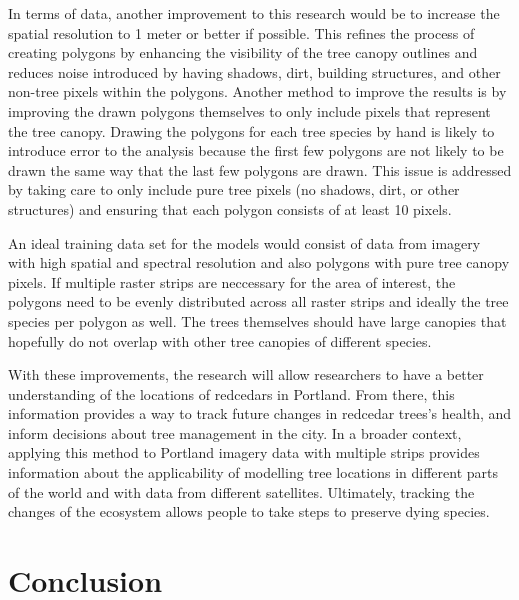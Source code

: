 \documentclass[12pt,twoside]{reedthesis}
\begin{document}
In terms of data, another improvement to this research would be to increase the spatial resolution to 1 meter or better if possible. This refines the process of creating polygons by enhancing the visibility of the tree canopy outlines and reduces noise introduced by having shadows, dirt, building structures, and other non-tree pixels within the polygons. Another method to improve the results is by improving the drawn polygons themselves to only include pixels that represent the tree canopy. Drawing the polygons for each tree species by hand is likely to introduce error to the analysis because the first few polygons are not likely to be drawn the same way that the last few polygons are drawn. This issue is addressed by taking care to only include pure tree pixels (no shadows, dirt, or other structures) and ensuring that each polygon consists of at least 10 pixels.

An ideal training data set for the models would consist of data from imagery with high spatial and spectral resolution and also polygons with pure tree canopy pixels. If multiple raster strips are neccessary for the area of interest, the polygons need to be evenly distributed across all raster strips and ideally the tree species per polygon as well. The trees themselves should have large canopies that hopefully do not overlap with other tree canopies of different species.

With these improvements, the research will allow researchers to have a better understanding of the locations of redcedars in Portland. From there, this information provides a way to track future changes in redcedar trees's health, and inform decisions about tree management in the city. In a broader context, applying this method to Portland imagery data with multiple strips provides information about the applicability of modelling tree locations in different parts of the world and with data from different satellites. Ultimately, tracking the changes of the ecosystem allows people to take steps to preserve dying species.

\hypertarget{conclusion}{%
\section{Conclusion}\label{conclusion}}
\end{document}
